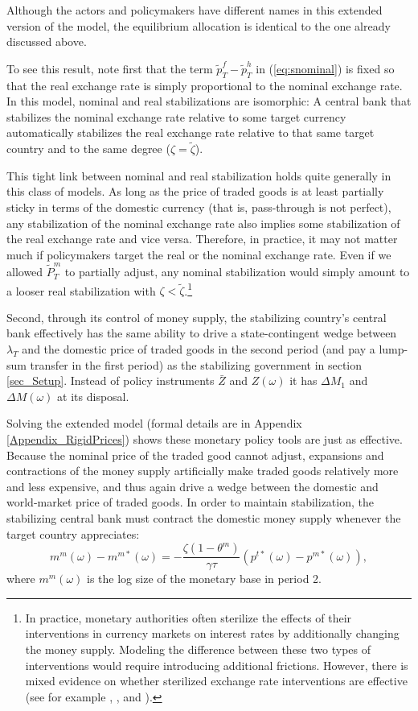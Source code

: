 \documentclass[12pt,letter]{article}
\theoremstyle{break} \theorembodyfont{\normalfont\itshape}
\theoremstyle{break}
\theoremstyle{break} \theorembodyfont{\normalfont\itshape}
\theoremstyle{break} \theorembodyfont{\normalfont\itshape}
\begin{document}
Although the actors and policymakers have different names in this
extended version of the model, the equilibrium allocation is identical
to the one already discussed above.

To see this result, note first that the term
\(\tilde{p}_T^f-\tilde{p}_T^h\) in (\ref{eq:snominal}) is fixed so
that the real exchange rate is simply proportional to the nominal
exchange rate. In this model, nominal and real stabilizations are
isomorphic: A central bank that stabilizes the nominal exchange rate
relative to some target currency automatically stabilizes the real
exchange rate relative to that same target country and to the same
degree ($\zeta=\tilde{\zeta}$).

This tight link between nominal and real stabilization holds quite
generally in this class of models. As long as the price of traded
goods is at least partially sticky in terms of the domestic currency
(that is, pass-through is not perfect), any stabilization of the
nominal exchange rate also implies some stabilization of the real
exchange rate and vice versa. Therefore, in practice, it may not
matter much if policymakers target the real or the nominal exchange
rate. Even if we allowed $\tilde{P}^m_T$ to partially adjust, any
nominal stabilization would simply amount to a looser real
stabilization with $\zeta<\tilde{\zeta}$.\footnote{In practice,
  monetary authorities often sterilize the effects of their
  interventions in currency markets on interest rates by additionally
  changing the money supply. Modeling the difference between these two
  types of interventions would require introducing additional
  frictions. However, there is mixed evidence on whether sterilized
  exchange rate interventions are effective (see for example
  \cite{Obstfeld1982}, \cite{ChamonGarciaSouza2017}, and
  \cite{Fratscheretal2019}). }
 
Second, through its control of money supply, the stabilizing country's
central bank effectively has the same ability to drive a
state-contingent wedge between \(\lambda_T\) and the domestic price of
traded goods in the second period (and pay a lump-sum transfer in the
first period) as the stabilizing government in section
\ref{sec_Setup}. Instead of policy instruments $\bar{Z} $ and
$Z(\omega)$ it has $\Delta M_1 $ and $\Delta M(\omega) $ at its
disposal.

Solving the extended model (formal details are in Appendix
\ref{Appendix_RigidPrices}) shows these monetary policy tools are just
as effective. Because the nominal price of the traded good cannot
adjust, expansions and contractions of the money supply artificially
make traded goods relatively more and less expensive, and thus again
drive a wedge between the domestic and world-market price of traded
goods. In order to maintain stabilization, the stabilizing central
bank must contract the domestic money supply whenever the target
country appreciates:
\begin{equation*}
  m^m(\omega) - m^{m \ast}(\omega)
  = - \frac{\zeta (1 - \theta^m)}{\gamma \tau}
  \left( p^{t \ast}(\omega) - p^{m \ast}(\omega) \right), 
\end{equation*}
where $m^m(\omega)$ is the log size of the monetary base in period 2.
\end{document}
